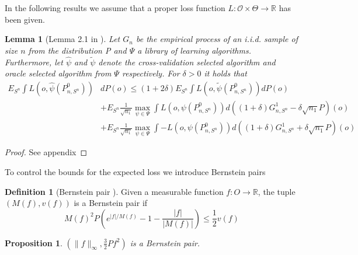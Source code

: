 \documentclass[11pt, a4paper]{article}
\newcommand\norm[1]{\lVert#1\rVert}
\newtheorem{proposition}[theorem]{Proposition}
\newtheorem{lemma}[theorem]{Lemma}
\theoremstyle{definition}
\newtheorem{definition}[theorem]{Definition}
\theoremstyle{remark}
\newcommand{\la}{\psi}
\newcommand{\Sn}{S^n}
\newcommand{\lib}{\Psi}
\begin{document}
In the following results we assume that a proper loss function $ L: \mathcal{O} \times \Theta \to \mathbb{R} $ has been given.  
\begin{lemma}[Lemma 2.1 in \parencite{vaart06}] \label{finitesampledecomp}
    Let $ G_{n} $ be the empirical process of an i.i.d. sample of size $ n $ from the distribution P and $ \lib$ a library of learning algorithms. Furthermore, let $ \hat{\la}  $ and $ \tilde{\la} $ denote the cross-validation selected algorithm and oracle selected algorithm from $ \lib $ respectively. For $ \delta > 0 $ it holds that
   \begin{align*}
       E_{\Sn} \int L(o, \hat{\la}(P_{n, \Sn}^{0})) &dP(o) \leq (1 + 2 \delta) E_{\Sn} \int L(o, \tilde{\la}(P_{n, \Sn}^{0})) d P(o) \\ 
                                                                &+E_{\Sn} \frac{1}{\sqrt{n_1} } \max_{\la \in \lib} \int L(o, \la(P_{n, \Sn}^{0})) d ((1 + \delta) G_{n,\Sn}^{1} - \delta \sqrt{n_1} P)(o)  \\
                                                                &+E_{\Sn} \frac{1}{\sqrt{n_1} } \max_{\la \in \lib} \int-L(o, \la(P_{n, \Sn}^{0})) d ((1 + \delta) G_{n,\Sn}^{1} + \delta \sqrt{n_1} P)(o)  
   \end{align*}
\end{lemma}
\begin{proof}
    See appendix
\end{proof}
To control the bounds for the expected loss we introduce Bernstein pairs 
\begin{definition}[Bernstein pair \parencite{vaart06}]
    Given a measurable function $ f: O \to \mathbb{R} $, the tuple $ (M(f) , v(f)) $ is a Bernstein pair if 
    \begin{equation} \label{bernstein}
        M(f)^2 P\left( e^{|f|/M(f)} -1 - \frac{|f|}{|M(f)|}\right) \leq \frac{1}{2}v(f) 
    \end{equation}
\end{definition}
\begin{proposition} \label{unifbernstein}
    $ (\norm{f}_{\infty}, \frac{3}{2} Pf^2 ) $ is a Bernstein pair. 
\end{proposition}
\end{document}
